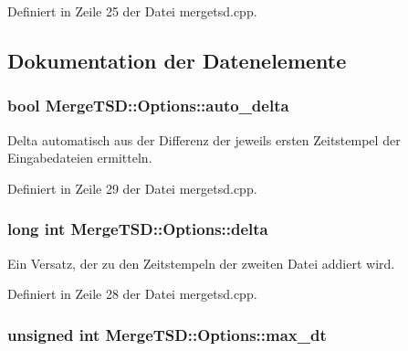 Definiert in Zeile 25 der Datei mergetsd.\-cpp.



\subsection{Dokumentation der Datenelemente}
\hypertarget{structMergeTSD_1_1Options_a59137e1e5d0466ddce1e5b70afec8f86}{
\subsubsection[{auto\-\_\-delta}]{\setlength{\rightskip}{0pt plus 5cm}bool Merge\-T\-S\-D\-::\-Options\-::auto\-\_\-delta}}\label{structMergeTSD_1_1Options_a59137e1e5d0466ddce1e5b70afec8f86}


Delta automatisch aus der Differenz der jeweils ersten Zeitstempel der Eingabedateien ermitteln. 



Definiert in Zeile 29 der Datei mergetsd.\-cpp.

\hypertarget{structMergeTSD_1_1Options_a9d6eb15b0c9103bb0f3a2cbe098cb9a1}{
\subsubsection[{delta}]{\setlength{\rightskip}{0pt plus 5cm}long int Merge\-T\-S\-D\-::\-Options\-::delta}}\label{structMergeTSD_1_1Options_a9d6eb15b0c9103bb0f3a2cbe098cb9a1}


Ein Versatz, der zu den Zeitstempeln der zweiten Datei addiert wird. 



Definiert in Zeile 28 der Datei mergetsd.\-cpp.

\hypertarget{structMergeTSD_1_1Options_a6fa812feda6841eff6455772f6f42980}{
\subsubsection[{max\-\_\-dt}]{\setlength{\rightskip}{0pt plus 5cm}unsigned int Merge\-T\-S\-D\-::\-Options\-::max\-\_\-dt}}\label{structMergeTSD_1_1Options_a6fa812feda6841eff6455772f6f42980}



